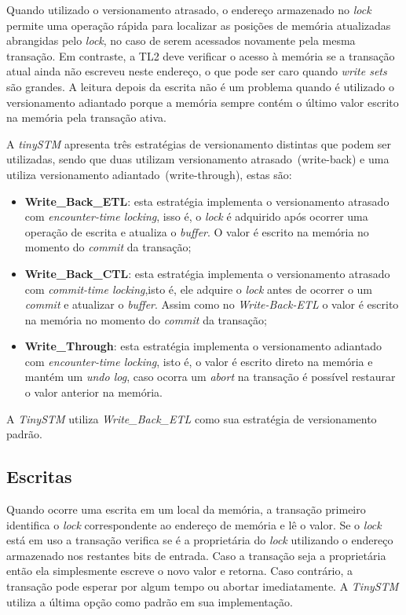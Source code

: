\documentclass[diss,capa]{texufpel}
\begin{document}
Quando utilizado o versionamento atrasado, o endereço armazenado no \emph{lock} permite uma operação rápida para localizar as posições de memória atualizadas abrangidas pelo \emph{lock}, no caso de serem acessados novamente pela mesma transação. Em contraste, a TL2 deve verificar o acesso à memória se a transação atual ainda não escreveu neste endereço, o que pode ser caro quando \emph{write sets} são grandes. A leitura depois da escrita não é um problema quando é utilizado o versionamento adiantado porque a memória sempre contém o último valor escrito na memória pela transação ativa.

A \emph{tinySTM} apresenta três estratégias de versionamento distintas que podem ser utilizadas, sendo que duas utilizam versionamento atrasado~(write-back) e uma utiliza versionamento adiantado~(write-through), estas são:

\begin{itemize}
 \item \textbf{Write\_Back\_ETL}: esta estratégia implementa o versionamento atrasado com \emph{encounter-time locking}, isso é, o \emph{lock} é adquirido após ocorrer uma operação de escrita e atualiza o \emph{buffer}. O valor é escrito na memória no momento do \emph{commit} da transação;

 \item \textbf{Write\_Back\_CTL}: esta estratégia implementa o versionamento atrasado com \emph{commit-time locking},isto é, ele adquire o \emph{lock} antes de ocorrer o um \emph{commit} e atualizar o \emph{buffer}. Assim como no \emph{Write-Back-ETL} o valor é escrito na memória no momento do \emph{commit} da transação;

 \item \textbf{Write\_Through}: esta estratégia implementa o versionamento adiantado com \emph{encounter-time locking}, isto é, o valor é escrito direto na memória e mantém um \emph{undo log}, caso ocorra um \emph{abort} na transação é possível restaurar o valor anterior na memória.
\end{itemize}

A \emph{TinySTM} utiliza \emph{Write\_Back\_ETL} como sua estratégia de versionamento padrão.

\subsection{Escritas}

Quando ocorre uma escrita em um local da memória, a transação primeiro identifica o \emph{lock} correspondente ao endereço de memória e lê o valor. Se o \emph{lock} está em uso a transação verifica se é a proprietária do \emph{lock} utilizando o endereço armazenado nos restantes bits de entrada. Caso a transação seja a proprietária então ela simplesmente escreve o novo valor e retorna. Caso contrário, a transação pode esperar por algum tempo ou abortar imediatamente. A \emph{TinySTM} utiliza a última opção como padrão em sua implementação.
\end{document}

